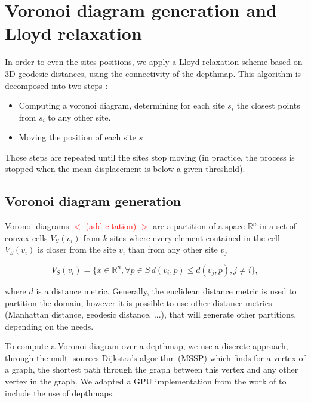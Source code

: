 \documentclass[11pt,fleqn]{book} %
\newcommand{\arnaud}[1]{\textcolor{red}{$<$ #1 $>$}}
\begin{document}

\section{Voronoi diagram generation and Lloyd relaxation}
\label{sec:lloyd_relaxation}

In order to even the sites positions, we apply a Lloyd relaxation scheme based on 3D geodesic distances, using the connectivity of the depthmap.
This algorithm is decomposed into two steps : 
\begin{itemize}
	\item Computing a voronoi diagram, determining for each site $s_i$ the closest points from $s_i$ to any other site.
	\item Moving the position of each site $s$
\end{itemize}

Those steps are repeated until the sites stop moving (in practice, the process is stopped when the mean displacement is below a given threshold).

\subsection{Voronoi diagram generation}
Voronoi diagrams \arnaud{(add citation)} are a partition of a space $\mathbb{R}^n$ in a set of convex cells $V_S(v_i)$ from $k$ sites where every element contained in the cell $V_S(v_i)$ is closer from the site $v_i$ than from any other site $v_j$

\begin{equation}
\label{eq:voronoi_cell}
	V_S(v_i) = \{ x \in \mathbb{R}^n, \forall p \in S\, d(v_i,p) \leq d(v_j,p), j \neq i\},
\end{equation}

where $d$ is a distance metric. Generally, the euclidean distance metric is used to partition the domain, however it is possible to use other distance metrics (Manhattan distance, geodesic distance, ...), that will generate other partitions, depending on the needs.

To compute a Voronoi diagram over a depthmap, we use a discrete approach, through the multi-sources Dijkstra's algorithm (MSSP) \cite{Dij59} which finds for a vertex of a graph, the shortest path through the graph between this vertex and any other vertex in the graph.
We adapted a GPU implementation from the work of \cite{PPA16} to include the use of depthmaps.
\end{document}
